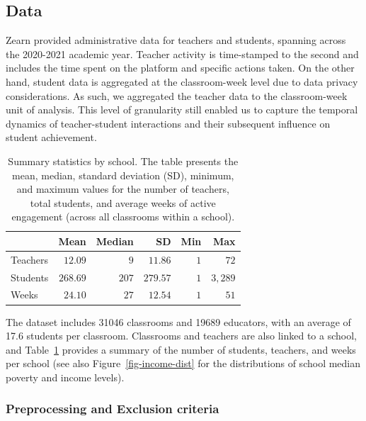 \documentclass[
  number,
  preprint,
  3p,
  onecolumn]{elsarticle}
\begin{document}
\subsection{Data}\label{data}

Zearn provided administrative data for teachers and students, spanning
across the 2020-2021 academic year. Teacher activity is time-stamped to
the second and includes the time spent on the platform and specific
actions taken. On the other hand, student data is aggregated at the
classroom-week level due to data privacy considerations. As such, we
aggregated the teacher data to the classroom-week unit of analysis. This
level of granularity still enabled us to capture the temporal dynamics
of teacher-student interactions and their subsequent influence on
student achievement.

\begin{longtable}{l|rrrrr}

\caption{\label{tbl-summary}Summary statistics by school. The table
presents the mean, median, standard deviation (SD), minimum, and maximum
values for the number of teachers, total students, and average weeks of
active engagement (across all classrooms within a school).}

\tabularnewline

\toprule
\multicolumn{1}{l}{} & Mean & Median & SD & Min & Max \\ 
\midrule\addlinespace[2.5pt]
Teachers & $12.09$ & $9$ & $11.86$ & $1$ & $72$ \\ 
Students & $268.69$ & $207$ & $279.57$ & $1$ & $3,289$ \\ 
Weeks & $24.10$ & $27$ & $12.54$ & $1$ & $51$ \\ 
\bottomrule

\end{longtable}

The dataset includes 31046 classrooms and 19689 educators, with an
average of 17.6 students per classroom. Classrooms and teachers are also
linked to a school, and Table~\ref{tbl-summary} provides a summary of
the number of students, teachers, and weeks per school (see also
Figure~\ref{fig-income-dist} for the distributions of school median
poverty and income levels).

\subsubsection{Preprocessing and Exclusion
criteria}\label{preprocessing-and-exclusion-criteria}
\end{document}

